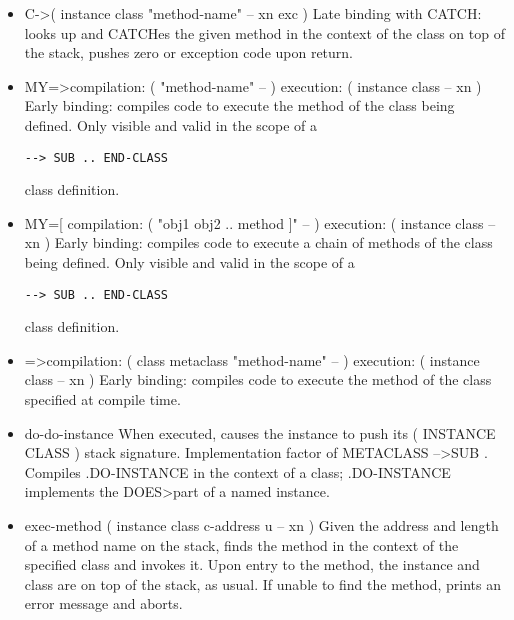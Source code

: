 \begin{;stlisting}[frame=single]
\begin{itemize}[noitemsep]
	\item C-\textgreater  ( instance class "method-name" -- xn
		exc )\newline
	Late binding with CATCH: looks up and CATCHes the given method
	in the context of the class on top of the stack, pushes zero or
	exception code upon return.

	\item MY=\textgreater  compilation: ( "method-name" -- )
		execution: ( instance class -- xn )\newline
	Early binding: compiles code to execute the method of the class
	being defined. Only visible and valid in the scope of a
\begin{lstlisting}[frame=single]
--> SUB .. END-CLASS
\end{lstlisting}
		class definition.

	\item MY=[ compilation: ( "obj1 obj2 .. method ]" -- )
		execution: ( instance class -- xn )\newline
	Early binding: compiles code to execute a chain of methods of
	the class being defined. Only visible and valid in the scope
	of a
\begin{lstlisting}[frame=single]
--> SUB .. END-CLASS
\end{lstlisting}
	class definition.

	\item =\textgreater compilation: ( class metaclass
		"method-name" -- ) execution: ( instance class
		-- xn )\newline
	Early binding: compiles code to execute the method of the class
	specified at compile time.

	\item do-do-instance\newline
	When executed, causes the instance to push its ( INSTANCE CLASS
	) stack signature. Implementation factor of
	METACLASS --\textgreater  SUB .
	Compiles .DO-INSTANCE in the context of a class; .DO-INSTANCE
	implements the DOES\textgreater  part of a named instance.

	\item exec-method ( instance class c-address u -- xn )\newline
	Given the address and length of a method name on the stack,
	finds the method in the context of the specified class and
	invokes it. Upon entry to the method, the instance and class are
	on top of the stack, as usual. If unable to find the method,
	prints an error message and aborts.


\end{itemize}
\end{;stlisting}
